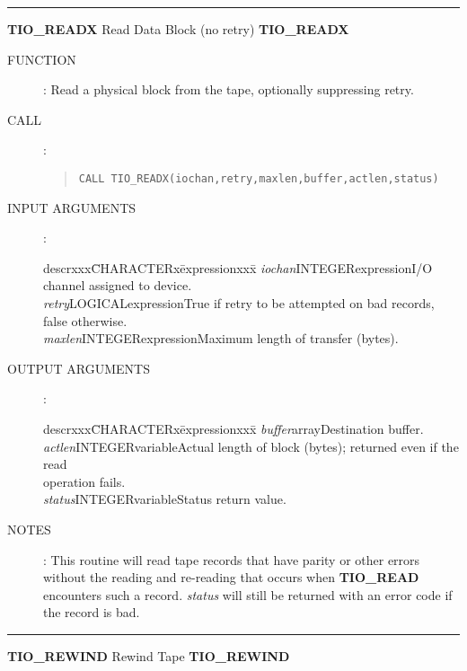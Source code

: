\goodbreak
\rule{\textwidth}{0.3mm}
{\Large {\bf TIO\_READX} \hfill Read Data Block (no retry) \hfill {\bf TIO\_READX}}
\begin{description}
\item [FUNCTION]:
Read a physical block from the tape, optionally suppressing retry.
\item [CALL]:
\begin{quote}
{\tt CALL TIO\_READX(iochan,retry,maxlen,buffer,actlen,status)}
\end{quote}
\item [INPUT ARGUMENTS]:
\begin{tabbing}
descrxxx\=CHARACTERx\=expressionxxx\=\kill
{\em iochan}\>INTEGER\>expression\>I/O channel assigned to device.\\
{\em retry}\>LOGICAL\>expression\>True if retry to be attempted on bad records,
false otherwise.\\
{\em maxlen}\>INTEGER\>expression\>Maximum length of transfer (bytes).
\end{tabbing}
\item [OUTPUT ARGUMENTS]:
\begin{tabbing}
descrxxx\=CHARACTERx\=expressionxxx\=\kill
{\em buffer}\>\>array\>Destination buffer.\\
{\em actlen}\>INTEGER\>variable\>Actual length of block (bytes); returned
even if the read\\
\>\>\>operation fails.\\
{\em status}\>INTEGER\>variable\>Status return value.
\end{tabbing}
\item [NOTES]:
This routine will read tape records that have parity or other errors without
the reading and re-reading that occurs when {\bf TIO\_READ} encounters such a
record.
{\em status} will still be returned with an error code if the record is bad.
\end{description}
\goodbreak
\rule{\textwidth}{0.3mm}
{\Large {\bf TIO\_REWIND} \hfill Rewind Tape \hfill {\bf TIO\_REWIND}}
